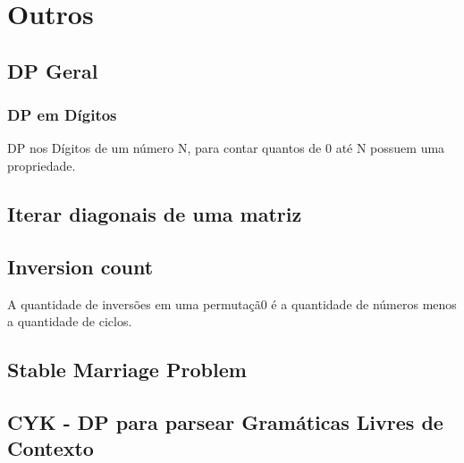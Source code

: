 \section{Outros}

\subsection{DP Geral}
\subsubsection{DP em D\'{i}gitos}
DP nos D\'{i}gitos de um n\'{u}mero N, para contar quantos de 0 at\'{e} N possuem uma propriedade.

\divisor

\subsection{Iterar diagonais de uma matriz}
\divisor

\subsection{Inversion count}
A quantidade de invers\~{o}es em uma permuta\c{c}\~{a}0 \'{e} a quantidade de n\'{u}meros menos a quantidade de ciclos.

\divisor

\subsection{Stable Marriage Problem}

\divisor

\subsection{CYK - DP para parsear Gram\'{a}ticas Livres de Contexto}
